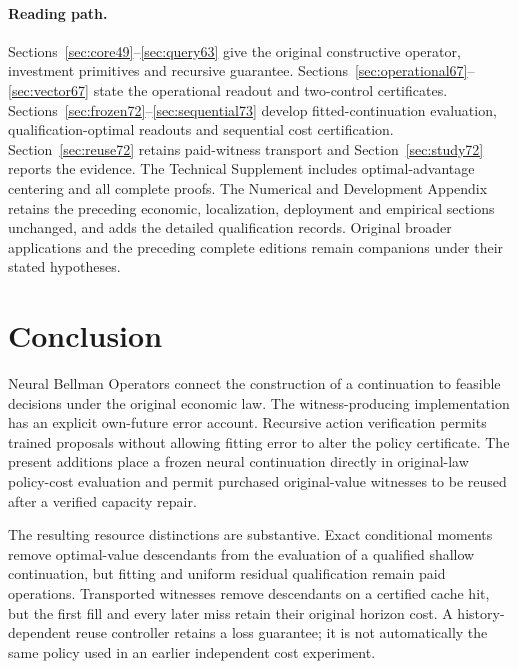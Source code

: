 \documentclass[ecta,nameyear,draft]{econsocart}
\begin{document}
\paragraph{Reading path.}
Sections~\ref{sec:core49}--\ref{sec:query63} give the original constructive operator, investment primitives and recursive guarantee. Sections~\ref{sec:operational67}--\ref{sec:vector67} state the operational readout and two-control certificates. Sections~\ref{sec:frozen72}--\ref{sec:sequential73} develop fitted-continuation evaluation, qualification-optimal readouts and sequential cost certification. Section~\ref{sec:reuse72} retains paid-witness transport and Section~\ref{sec:study72} reports the evidence. The Technical Supplement includes optimal-advantage centering and all complete proofs. The Numerical and Development Appendix retains the preceding economic, localization, deployment and empirical sections unchanged, and adds the detailed qualification records. Original broader applications and the preceding complete editions remain companions under their stated hypotheses.












\section{Conclusion}\label{sec:conclusion65}
Neural Bellman Operators connect the construction of a continuation to feasible decisions under the original economic law. The witness-producing implementation has an explicit own-future error account. Recursive action verification permits trained proposals without allowing fitting error to alter the policy certificate. The present additions place a frozen neural continuation directly in original-law policy-cost evaluation and permit purchased original-value witnesses to be reused after a verified capacity repair.

The resulting resource distinctions are substantive. Exact conditional moments remove optimal-value descendants from the evaluation of a qualified shallow continuation, but fitting and uniform residual qualification remain paid operations. Transported witnesses remove descendants on a certified cache hit, but the first fill and every later miss retain their original horizon cost. A history-dependent reuse controller retains a loss guarantee; it is not automatically the same policy used in an earlier independent cost experiment.
\end{document}
